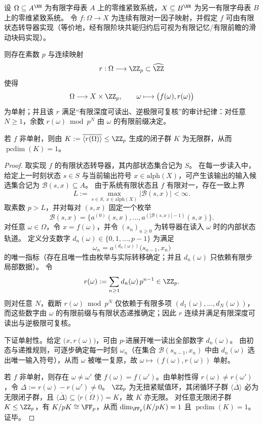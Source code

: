 \begin{theorem}\label{thm:conclusion-uniaxial-zp-replay-reversibilization}
设 \(\Omega\subseteq A^{\NN}\) 为有限字母表 \(A\) 上的零维紧致系统，\(X\subseteq B^{\NN}\) 为另一有限字母表 \(B\) 上的零维紧致系统。
令 \(f:\Omega\to X\) 为连续有限对一因子映射，并假定 \(f\) 可由有限状态转导器实现（等价地，经有限阶块共轭归约后可视为有限记忆/有限前瞻的滑动块码实现）。
\par
则存在素数 \(p\) 与连续映射
\[
r:\Omega\longrightarrow \ZZ_p\subset \widehat{\ZZ}
\]
使得
\[
\Omega\longrightarrow X\times \ZZ_p,\qquad \omega\longmapsto \bigl(f(\omega),r(\omega)\bigr)
\]
为单射；并且该 \(r\) 满足“有限深度可读出、逆极限可复核”的审计纪律：对任意 \(N\ge 1\)，余数 \(r(\omega)\bmod p^N\) 由 \(\omega\) 的有限前缀决定。
\par
若 \(f\) 非单射，则由
\(
K:=\overline{\langle r(\Omega)\rangle}\le \ZZ_p
\)
生成的闭子群 \(K\) 为无限群，从而 \(\operatorname{pcdim}(K)=1\)。
\end{theorem}
\begin{proof}
取实现 \(f\) 的有限状态转导器，其内部状态集合记为 \(S\)。
在每一步读入中，给定上一时刻状态 \(s\in S\) 与当前输出符号 \(x\in \mathrm{alph}(X)\)，可产生该输出的输入候选集合记为 \(\mathcal B(s,x)\subseteq A\)。
由于系统有限状态且 \(f\) 有限对一，存在一致上界
\[
L:=\max_{s\in S,\ x\in\mathrm{alph}(X)}|\mathcal B(s,x)|<\infty.
\]
取素数 \(p>L\)，并对每对 \((s,x)\) 固定一个枚举
\[
\mathcal B(s,x)=\bigl\{a^{(0)}(s,x),\dots,a^{(|\mathcal B(s,x)|-1)}(s,x)\bigr\}.
\]
对任意 \(\omega\in\Omega\)，令 \(x=f(\omega)\)，并令 \((s_n)_{n\ge 0}\) 为转导器在读入 \(\omega\) 时的内部状态轨道。
定义分支数字 \(d_n(\omega)\in\{0,1,\dots,p-1\}\) 为满足
\[
\omega_n=a^{(d_n(\omega))}\bigl(s_{n-1},x_n\bigr)
\]
的唯一指标（存在且唯一性由枚举与实际转移确定；并且 \(d_n(\omega)\) 只依赖有限步局部数据）。
令
\[
r(\omega):=\sum_{n\ge 1} d_n(\omega)\,p^{n-1}\in\ZZ_p.
\]
则对任意 \(N\)，截断 \(r(\omega)\bmod p^N\) 仅依赖于有限多项 \((d_1(\omega),\dots,d_N(\omega))\)，而这些数字由 \(\omega\) 的有限前缀与有限状态递推确定；因此 \(r\) 连续并满足有限深度可读出与逆极限可复核。
\par
下证单射性。给定 \(\bigl(x,r(\omega)\bigr)\)，可由 \(p\)-进展开唯一读出全部数字 \(d_n(\omega)\)。
由初态与递推规则，可逐步确定每一时刻 \(\omega_n\)（在集合 \(\mathcal B(s_{n-1},x_n)\) 中由 \(d_n(\omega)\) 选出唯一输入符号），从而 \(\omega\) 被唯一复原，故 \(\omega\mapsto (f(\omega),r(\omega))\) 单射。
\par
若 \(f\) 非单射，则存在 \(\omega\neq\omega'\) 使 \(f(\omega)=f(\omega')\)。由单射性得 \(r(\omega)\neq r(\omega')\)，令 \(\Delta:=r(\omega)-r(\omega')\neq 0\)。
\(\ZZ_p\) 为无扭紧赋值环，其闭循环子群 \(\overline{\langle \Delta\rangle}\) 必为无限闭子群，且
\(\overline{\langle \Delta\rangle}\subseteq \overline{\langle r(\Omega)\rangle}=K\)，故 \(K\) 亦无限。
对任意无限闭子群 \(K\le \ZZ_p\)，有 \(K/pK\cong\FF_p\)，从而 \(\dim_{\FF_p}(K/pK)=1\) 且 \(\operatorname{pcdim}(K)=1\)。证毕。
\end{proof}

